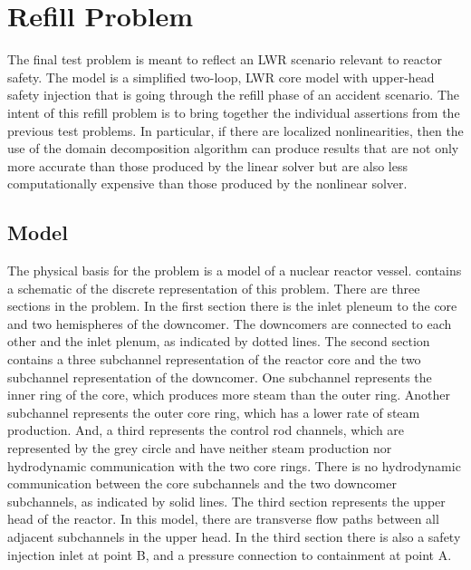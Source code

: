 \section{Refill Problem}
\label{sect:refillProblem}

The final test problem is meant to reflect an LWR scenario relevant to reactor safety.
The model is a simplified two-loop, LWR core model with upper-head safety injection that is going through the refill phase of an accident scenario.
The intent of this refill problem is to bring together the individual assertions from the previous test problems.
In particular, if there are localized nonlinearities, then the use of the domain decomposition algorithm can produce results that are not only more accurate than those produced by the linear solver but are also less computationally expensive than those produced by the nonlinear solver.

\subsection{Model}
\label{sect:refillModel}

The physical basis for the problem is a model of a nuclear reactor vessel.
 contains a schematic of the discrete representation of this problem.
There are three sections in the problem.
In the first section there is the inlet pleneum to the core and two hemispheres of the downcomer.
The downcomers are connected to each other and the inlet plenum, as indicated by dotted lines.
The second section contains a three subchannel representation of the reactor core and the two subchannel representation of the downcomer.
One subchannel represents the inner ring of the core, which produces more steam than the outer ring.
Another subchannel represents the outer core ring, which has a lower rate of steam production.
And, a third represents the control rod channels, which are represented by the grey circle and have neither steam production nor hydrodynamic communication with the two core rings.
There is no hydrodynamic communication between the core subchannels and the two downcomer subchannels, as indicated by solid lines.
The third section represents the upper head of the reactor.
In this model, there are transverse flow paths between all adjacent subchannels in the upper head.
In the third section there is also a safety injection inlet at point B, and a pressure connection to containment at point A.

